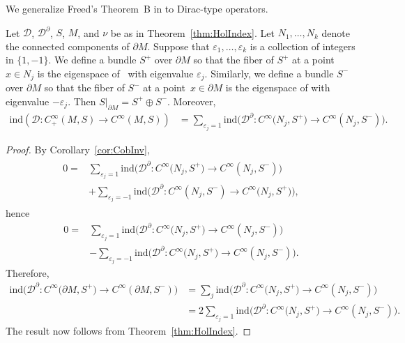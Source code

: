 We generalize Freed's Theorem~B in \cite{Freed} to Dirac-type operators.

\begin{Corollary}\label{cor:Freed}
Let $\mathcal{D}$, $\mathcal{D}^\partial$, $S$, $M$, and $\nu$ be as in Theorem~{\rm\ref{thm:HolIndex}}.
Let $N_1,\hdots,N_k$ denote the connected components of $\partial M$.
Suppose that $\varepsilon_1,\hdots,\varepsilon_k$ is a collection of integers in $\{1,-1\}$. We define a bundle $S^+$ over $\partial M$ so that the fiber of $S^+$ at a point $x \in N_j$ is the eigenspace of~ with eigenvalue $\varepsilon_j$. Similarly, we define a bundle $S^-$ over $\partial M$ so that the fiber of $S^-$ at a point~${x \in \partial M}$ is the eigenspace of  with eigenvalue $-\varepsilon_j$. Then $S|_{\partial M} = S^+ \oplus S^-$. Moreover,
\begin{align*}
\mathrm{ind}(\mathcal{D}\colon C^\infty_+(M,S)\to C^\infty(M,S))
&=
\sum_{\varepsilon_j=1} \mathrm{ind}\big(\mathcal{D}^\partial\colon C^\infty\big(N_j,S^+\big)\to C^\infty(N_j,S^-)\big) .
\end{align*}
\end{Corollary}

\begin{proof}
By Corollary~\ref{cor:CobInv},
\begin{align*}
\begin{aligned}
0
={}&
\sum_{\varepsilon_j=1} \mathrm{ind}\big(\mathcal{D}^\partial\colon C^\infty\big(N_j,S^+\big)\to C^\infty(N_j,S^-)\big) \\
& + \sum_{\varepsilon_j=-1} \mathrm{ind}\big(\mathcal{D}^\partial\colon C^\infty(N_j,S^-)\to C^\infty\big(N_j,S^+\big)\big),
\end{aligned}
\end{align*}
hence
\begin{align*}
0
={}&
\sum_{\varepsilon_j=1} \mathrm{ind}\big(\mathcal{D}^\partial\colon C^\infty\big(N_j,S^+\big)\to C^\infty(N_j,S^-)\big) \\
& - \sum_{\varepsilon_j=-1} \mathrm{ind}\big(\mathcal{D}^\partial\colon C^\infty\big(N_j,S^+\big)\to C^\infty(N_j,S^-)\big) .
\end{align*}
Therefore,
\begin{align*}
\mathrm{ind}\big(\mathcal{D}^\partial\colon C^\infty\big(\partial M,S^+\big)\to C^\infty(\partial M,S^-)\big)
&=
\sum_j \mathrm{ind}\big(\mathcal{D}^\partial\colon C^\infty\big(N_j,S^+\big)\to C^\infty(N_j,S^-)\big) \\
&=
2 \sum_{\varepsilon_j=1} \mathrm{ind}\big(\mathcal{D}^\partial\colon C^\infty\big(N_j,S^+\big)\to C^\infty(N_j,S^-)\big).
\end{align*}
The result now follows from Theorem~\ref{thm:HolIndex}.
\end{proof}
